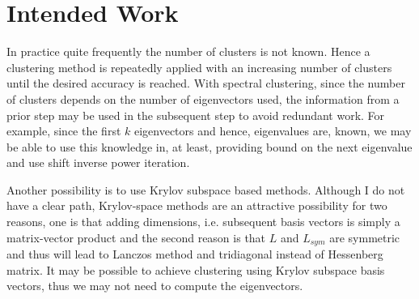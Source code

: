\documentclass[10pt,a4paper, nocenter]{report}
\begin{document}
    \chapter{Intended Work}
    In practice quite frequently the number of clusters is not known. Hence a clustering method is repeatedly applied with an increasing number of clusters until the desired accuracy is reached. With spectral clustering, since the number of clusters depends on the number of eigenvectors used, the information from a prior step may be used in the subsequent step to avoid redundant work. For example, since the first $k$ eigenvectors and hence, eigenvalues are, known, we may be able to use this knowledge in, at least, providing bound on the next eigenvalue and use shift inverse power iteration. 

    Another possibility is to use Krylov subspace based methods. Although I do not have a clear path, Krylov-space methods are an attractive possibility for two reasons, one is that adding dimensions, i.e. subsequent basis vectors is simply a matrix-vector product and the second reason is that $L$ and $L_{sym}$ are symmetric and thus will lead to Lanczos method and tridiagonal instead of Hessenberg matrix. It may be possible to achieve clustering using Krylov subspace basis vectors, thus we may not need to compute the eigenvectors. 


    \appendix
\end{document}
